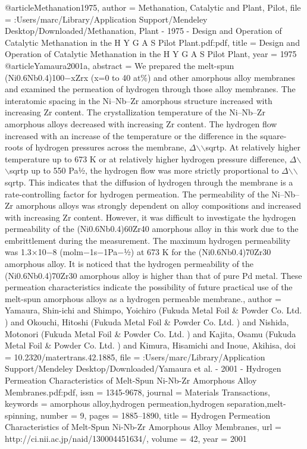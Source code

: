 @article{Methanation1975,
author = {Methanation, Catalytic and Plant, Pilot},
file = {:Users/marc/Library/Application Support/Mendeley Desktop/Downloaded/Methanation, Plant - 1975 - Design and Operation of Catalytic Methanation in the H Y G A S Pilot Plant.pdf:pdf},
title = {{Design and Operation of Catalytic Methanation in the H Y G A S Pilot Plant}},
year = {1975}
}
@article{Yamaura2001a,
abstract = {We prepared the melt-spun (Ni0.6Nb0.4)100−xZrx (x=0 to 40 at{\%}) and other amorphous alloy membranes and examined the permeation of hydrogen through those alloy membranes. The interatomic spacing in the Ni–Nb–Zr amorphous structure increased with increasing Zr content. The crystallization temperature of the Ni–Nb–Zr amorphous alloys decreased with increasing Zr content. The hydrogen flow increased with an increase of the temperature or the difference in the square-roots of hydrogen pressures across the membrane, $\Delta$$\backslash$$\backslash$sqrtp. At relatively higher temperature up to 673 K or at relatively higher hydrogen pressure difference, $\Delta$$\backslash$$\backslash$sqrtp up to 550 Pa1⁄2, the hydrogen flow was more strictly proportional to $\Delta$$\backslash$$\backslash$sqrtp. This indicates that the diffusion of hydrogen through the membrane is a rate-controlling factor for hydrogen permeation. The permeability of the Ni–Nb–Zr amorphous alloys was strongly dependent on alloy compositions and increased with increasing Zr content. However, it was difficult to investigate the hydrogen permeability of the (Ni0.6Nb0.4)60Zr40 amorphous alloy in this work due to the embrittlement during the measurement. The maximum hydrogen permeability was 1.3×10−8 (mol{\textperiodcentered}m−1{\textperiodcentered}s−1{\textperiodcentered}Pa−1⁄2) at 673 K for the (Ni0.6Nb0.4)70Zr30 amorphous alloy. It is noticed that the hydrogen permeability of the (Ni0.6Nb0.4)70Zr30 amorphous alloy is higher than that of pure Pd metal. These permeation characteristics indicate the possibility of future practical use of the melt-spun amorphous alloys as a hydrogen permeable membrane.},
author = {Yamaura, Shin-ichi and Shimpo, Yoichiro (Fukuda Metal Foil {\&} Powder Co. Ltd. ) and Okouchi, Hitoshi (Fukuda Metal Foil {\&} Powder Co. Ltd. ) and Nishida, Motonori (Fukuda Metal Foil {\&} Powder Co. Ltd. ) and Kajita, Osamu (Fukuda Metal Foil {\&} Powder Co. Ltd. ) and Kimura, Hisamichi and Inoue, Akihisa},
doi = {10.2320/matertrans.42.1885},
file = {:Users/marc/Library/Application Support/Mendeley Desktop/Downloaded/Yamaura et al. - 2001 - Hydrogen Permeation Characteristics of Melt-Spun Ni-Nb-Zr Amorphous Alloy Membranes.pdf:pdf},
issn = {1345-9678},
journal = {Materials Transactions},
keywords = {amorphous alloy,hydrogen permeation,hydrogen separation,melt-spinning},
number = {9},
pages = {1885--1890},
title = {{Hydrogen Permeation Characteristics of Melt-Spun Ni-Nb-Zr Amorphous Alloy Membranes}},
url = {http://ci.nii.ac.jp/naid/130004451634/},
volume = {42},
year = {2001}
}
